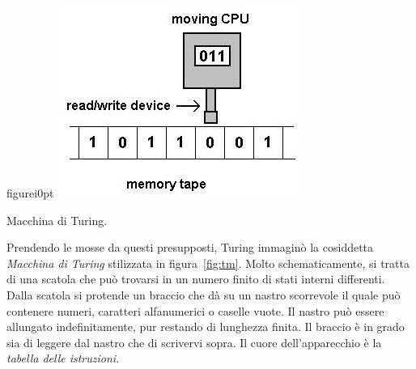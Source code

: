 \begin{wrapfloat}{figure}{i}{0pt}
	\centering
	\includegraphics[width=0.5\columnwidth]{immagini/turing}
	\caption{Macchina di Turing.}
	\label{fig:tm}
\end{wrapfloat}
Prendendo  le mosse da questi presupposti, Turing immaginò la cosiddetta \emph{Macchina di Turing} stilizzata in figura~\ref{fig:tm}.
Molto schematicamente, si tratta di una scatola che può trovarsi in un numero finito di stati interni differenti.
Dalla scatola si protende un braccio che dà su un nastro scorrevole il quale può contenere numeri, caratteri alfanumerici o caselle vuote.
Il nastro può essere allungato indefinitamente, pur restando di lunghezza finita.
Il braccio è in grado sia di leggere dal nastro che di scrivervi sopra.
Il cuore dell'apparecchio è la \emph{tabella delle istruzioni}.

